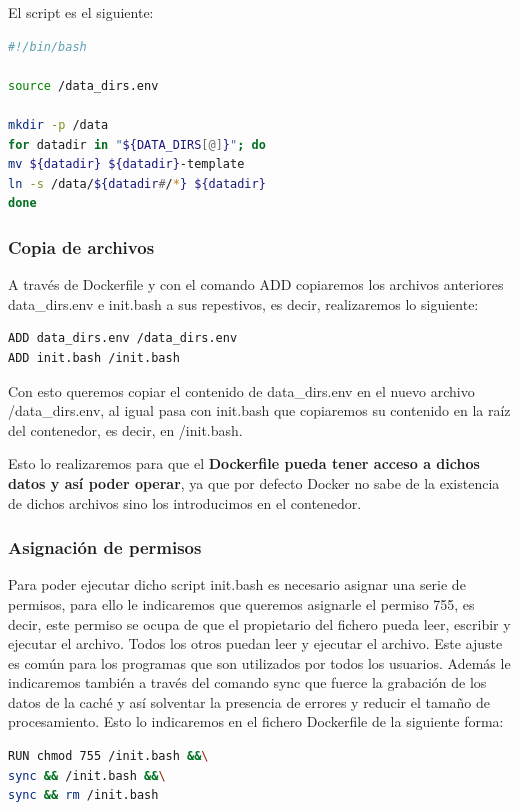 El script es el siguiente:

\begin{lstlisting}[language=bash]
#!/bin/bash

source /data_dirs.env

mkdir -p /data
for datadir in "${DATA_DIRS[@]}"; do
mv ${datadir} ${datadir}-template
ln -s /data/${datadir#/*} ${datadir}
done

\end{lstlisting}
\subsubsection{Copia de archivos}
A través de Dockerfile y con el comando ADD copiaremos los archivos anteriores data\_dirs.env e init.bash a sus repestivos, es decir, realizaremos lo siguiente:
\begin{lstlisting}[language=bash]
ADD data_dirs.env /data_dirs.env
ADD init.bash /init.bash
\end{lstlisting}
Con esto queremos copiar el contenido de data\_dirs.env en el nuevo archivo /data\_dirs.env, al igual pasa con init.bash que copiaremos su contenido en la raíz del contenedor, es decir, en /init.bash.

Esto lo realizaremos para que el \textbf{Dockerfile pueda tener acceso a dichos datos y así poder operar}, ya que por defecto Docker no sabe de la existencia de dichos archivos sino los introducimos en el contenedor.

\subsubsection{Asignación de permisos}
Para poder ejecutar dicho script init.bash es necesario asignar una serie de permisos, para ello le indicaremos que queremos asignarle el permiso 755, es decir, este permiso se ocupa de que el propietario del fichero pueda leer, escribir y ejecutar el archivo. Todos los otros puedan leer y ejecutar el archivo. Este ajuste es común para los programas que son utilizados por todos los usuarios.
\newpage
Además le indicaremos también a través del comando sync que fuerce la grabación de los datos de la caché y así solventar la presencia de errores y reducir el tamaño de procesamiento.
Esto lo indicaremos en el fichero Dockerfile de la siguiente forma:
\begin{lstlisting}[language=bash]
RUN chmod 755 /init.bash &&\
sync && /init.bash &&\
sync && rm /init.bash
\end{lstlisting}

